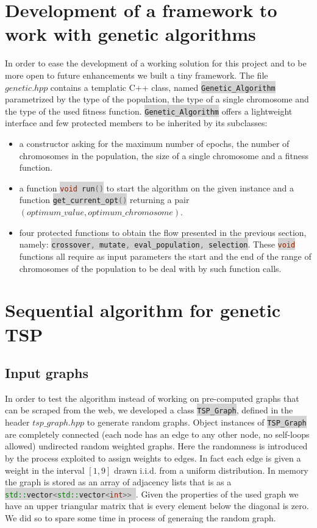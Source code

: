 \documentclass[11pt]{article}
\newcommand{\inlinecode}[2]{\colorbox{lightgray}{\lstinline[language=#1]$#2$}}
\begin{document}
\section{Development of a framework to work with genetic algorithms}
In order to ease the development of a working solution for this project and to be more open to future enhancements we built a tiny framework. The file $ genetic.hpp $ contains a templatic C++ class, named \inlinecode{C++}{Genetic_Algorithm} parametrized by the type of the population, the type of a single chromosome and the type of the used fitness function. \inlinecode{C++}{Genetic_Algorithm} offers a lightweight interface and few protected members to be inherited by its subclasses:
\begin{itemize}
	\item a constructor asking for the maximum number of epochs, the number of chromosomes in the population, the size of a single chromosome and a fitness function.
	\item a function \inlinecode{C++}{void run()} to start the algorithm on the given instance and a function \inlinecode{C++}{get_current_opt()} returning a pair $ (optimum\_value, optimum\_chromosome) $.
	\item four protected functions to obtain the flow presented in the previous section, namely: \inlinecode{C++}{crossover, mutate, eval_population, selection}. These \inlinecode{C++}{void} functions all require as input parameters the start and the end of the range of chromosomes of the population to be deal with by such function calls.
\end{itemize}

\section{Sequential algorithm for genetic TSP}
\subsection{Input graphs}
In order to test the algorithm instead of working on pre-computed graphs that can be scraped from the web, we developed a class \inlinecode{C++}{TSP_Graph}, defined in the header $ tsp\_graph.hpp $ to generate random graphs. Object instances of \inlinecode{C++}{TSP_Graph} are completely connected (each node has an edge to any other node, no self-loops allowed) undirected random weighted graphs. Here the randomness is introduced by the process exploited to assign weights to edges. In fact each edge is given a weight in the interval $ [1,9] $ drawn i.i.d. from a uniform distribution. In memory the graph is stored as an array of adjacency lists that is as a \inlinecode{C++}{std::vector<std::vector<int>> }. Given the properties of the used graph we have an upper triangular matrix that is every element below the diagonal is zero. We did so to spare some time in process of generaing the random graph.
\end{document}
